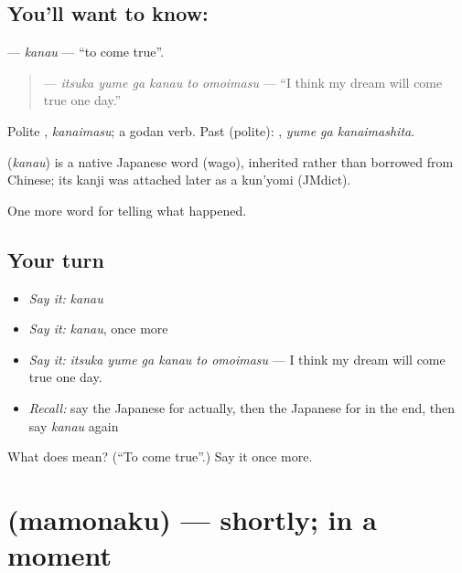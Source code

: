 \subsection*{You'll want to know: }
\textbf{} — \emph{kanau} — \textquotedblleft{}to come true\textquotedblright{}.

\begin{quote}
\textbf{   } — \emph{itsuka yume ga kanau to omoimasu} — \textquotedblleft{}I think my dream will come true one day.\textquotedblright{}
\end{quote}

Polite \textbf{}, \emph{kanaimasu}; a godan verb. Past (polite): \textbf{ }, \emph{yume ga kanaimashita}.

\begin{cousinweb}
\textbf{} (\emph{kanau}) is a native Japanese word (wago), inherited rather than borrowed from Chinese; its kanji was attached later as a kun'yomi (JMdict).
\end{cousinweb}

\begin{grammarlens}[title={What you've built}]
One more word for telling what happened.
\end{grammarlens}

\subsection*{Your turn}
\begin{itemize}
\raggedright
  \item \emph{Say it:} \emph{kanau}
  \item \emph{Say it:} \emph{kanau}, once more
  \item \emph{Say it:} \emph{itsuka yume ga kanau to omoimasu} — I think my dream will come true one day.
  \item \emph{Recall:} say the Japanese for actually, then the Japanese for in the end, then say \emph{kanau} again
\end{itemize}

\begin{tcolorbox}[breakable,colback=teal!4,colframe=teal!35!black,title={Before you move on}]
What does  mean? (\textquotedblleft{}To come true\textquotedblright{}.) Say it once more.
\end{tcolorbox}
\section[\texorpdfstring{\ja{まもなく} (mamonaku)}{まもなく (mamonaku)}]{ (mamonaku) — shortly; in a moment}

